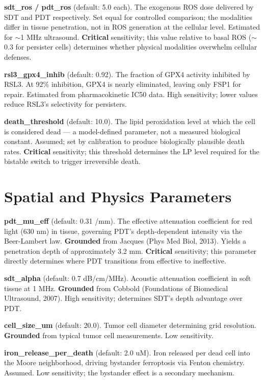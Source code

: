 \documentclass[11pt,twoside,openright]{report}
\begin{document}
\textbf{sdt\_ros / pdt\_ros} (default: 5.0 each). The exogenous ROS dose delivered by SDT and PDT respectively. Set equal for controlled comparison; the modalities differ in tissue penetration, not in ROS generation at the cellular level. Estimated for $\sim$1 MHz ultrasound. \textbf{Critical} sensitivity; this value relative to basal ROS ($\sim$0.3 for persister cells) determines whether physical modalities overwhelm cellular defenses.

\textbf{rsl3\_gpx4\_inhib} (default: 0.92). The fraction of GPX4 activity inhibited by RSL3. At 92\% inhibition, GPX4 is nearly eliminated, leaving only FSP1 for repair. Estimated from pharmacokinetic IC50 data. High sensitivity; lower values reduce RSL3's selectivity for persisters.

\textbf{death\_threshold} (default: 10.0). The lipid peroxidation level at which the cell is considered dead --- a model-defined parameter, not a measured biological constant. Assumed; set by calibration to produce biologically plausible death rates. \textbf{Critical} sensitivity; this threshold determines the LP level required for the bistable switch to trigger irreversible death.

\section{Spatial and Physics Parameters}

\textbf{pdt\_mu\_eff} (default: 0.31 /mm). The effective attenuation coefficient for red light (630 nm) in tissue, governing PDT's depth-dependent intensity via the Beer-Lambert law. \textbf{Grounded} from Jacques (Phys Med Biol, 2013). Yields a penetration depth of approximately 3.2 mm. \textbf{Critical} sensitivity; this parameter directly determines where PDT transitions from effective to ineffective.

\textbf{sdt\_alpha} (default: 0.7 dB/cm/MHz). Acoustic attenuation coefficient in soft tissue at 1 MHz. \textbf{Grounded} from Cobbold (Foundations of Biomedical Ultrasound, 2007). High sensitivity; determines SDT's depth advantage over PDT.

\textbf{cell\_size\_um} (default: 20.0). Tumor cell diameter determining grid resolution. \textbf{Grounded} from typical tumor cell measurements. Low sensitivity.

\textbf{iron\_release\_per\_death} (default: 2.0 uM). Iron released per dead cell into the Moore neighborhood, driving bystander ferroptosis via Fenton chemistry. Assumed. Low sensitivity; the bystander effect is a secondary mechanism.
\end{document}
